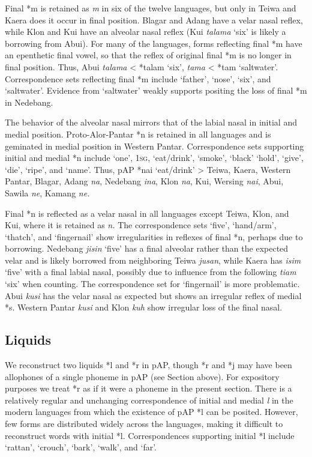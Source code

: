Final *m is retained as \textit{m }in six of the twelve languages, but only in Teiwa and Kaera does it occur in final position. Blagar and Adang have a velar nasal reflex, while Klon and Kui have an alveolar nasal reflex (Kui \textit{talama} `six' is likely a borrowing from Abui). For many of the languages, forms reflecting final *m have an epenthetic final vowel, so that the reflex of original final *m is no longer in final position. Thus, Abui \textit{tala{\textlengthmark}ma }{\textless} *talam `six', \textit{tama} {\textless} *tam `saltwater'. Correspondence sets reflecting final *m include `father', `nose', `six', and `saltwater'. Evidence from `saltwater' weakly supports positing the loss of final *m in Nedebang.

The behavior of the alveolar nasal mirrors that of the labial nasal in initial and medial position. Proto-Alor-Pantar *n is retained in all languages and is geminated in medial position in Western Pantar. Correspondence sets supporting initial and medial *n include `one', \textsc{1sg}, `eat/drink', `smoke', `black' `hold', `give', `die', `ripe', and `name'. Thus, pAP *nai `eat/drink' {\textgreater} Teiwa, Kaera, Western Pantar, Blagar, Adang \textit{na}, Nedebang \textit{ina}, Klon \textit{na{\textlengthmark}{\textglotstop}}, Kui, Wersing \textit{nai}, Abui, Sawila \textit{ne{\textlengthmark}}, Kamang \textit{ne. }

Final *n is reflected as a velar nasal in all languages except Teiwa, Klon, and Kui, where it is retained as \textit{n. }The correspondence sets `five', `hand/arm', `thatch', and `fingernail' show irregularities in reflexes of final *n, perhaps due to borrowing. Nedebang \textit{jisin }`five' has a final alveolar rather than the expected velar and is likely borrowed from neighboring Teiwa \textit{jusan}, while Kaera has \textit{isim} `five' with a final labial nasal, possibly due to influence from the following \textit{tiam} `six' when counting. The correspondence set for `fingernail' is more problematic. Abui \textit{kusi{\ng} }has the velar nasal as expected but shows an irregular reflex of medial *s. Western Pantar \textit{kusi }and Klon \textit{kuh} show irregular loss of the final nasal.

\subsection{ Liquids}
We reconstruct two liquids *l and *r in pAP, though *r and *j may have been allophones of a single phoneme in pAP (see Section above). For expository purposes we treat *r as if it were a phoneme in the present section. There is a relatively regular and unchanging correspondence of initial and medial \textit{l} in the modern languages from which the existence of pAP *l can be posited. However, few forms are distributed widely across the languages, making it difficult to reconstruct words with initial *l. Correspondences supporting initial *l include `rattan', `crouch', `bark', `walk', and `far'.

